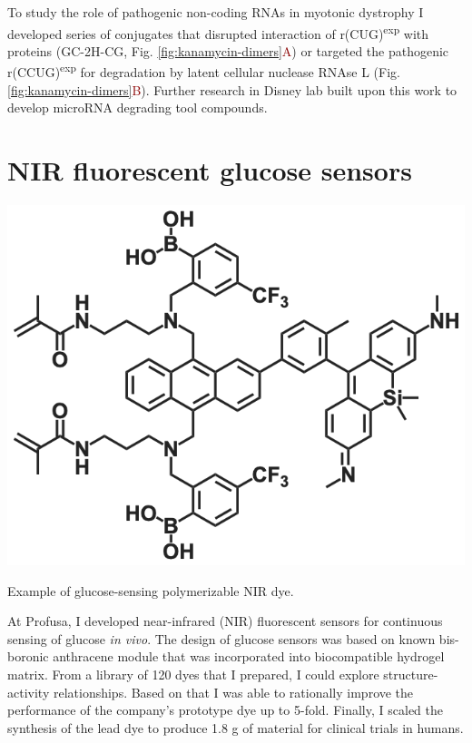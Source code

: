 \documentclass{tufte-handout}
\begin{document}
 To study the role of pathogenic non-coding RNAs in myotonic dystrophy I developed series of conjugates that disrupted interaction of r(CUG)\textsuperscript{exp} with proteins (GC-2H-CG, Fig. \ref{fig:kanamycin-dimers}\textcolor{DarkRed}{A}) or targeted the pathogenic r(CCUG)\textsuperscript{exp} for degradation by latent cellular nuclease RNAse L (Fig. \ref{fig:kanamycin-dimers}\textcolor{DarkRed}{B}). Further research in Disney lab built upon this work to develop microRNA degrading tool compounds.



\section{NIR fluorescent glucose sensors}

\begin{marginfigure}\label{fig:profusa}
	\includegraphics{v1dye.png}
	\caption{Example of glucose-sensing polymerizable NIR dye.}
\end{marginfigure}

At Profusa, I developed near-infrared (NIR) fluorescent sensors for continuous sensing of glucose \textit{in vivo}. The design of glucose sensors was based on known bis-boronic anthracene module that was incorporated into biocompatible hydrogel matrix. From a library of 120 dyes that I prepared\cite{Gamsey2018}, I could explore structure-activity relationships. Based on that I was able to rationally improve the performance of the company's prototype dye up to 5-fold. Finally, I scaled the synthesis of the lead dye to produce 1.8 g of material for clinical trials in humans.
\end{document}
